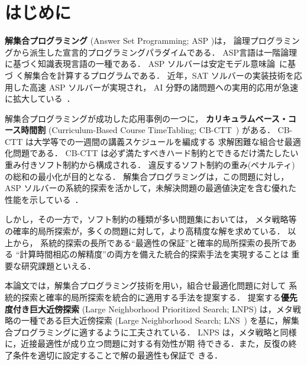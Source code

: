 \section{はじめに}

\textbf{解集合プログラミング}
(Answer Set Programming; ASP
\cite{%
  baral03:cambridge,%
  DBLP:conf/iclp/GelfondL88,%
  DBLP:journals/amai/Niemela99})は，
論理プログラミングから派生した宣言的プログラミングパラダイムである．
ASP言語は一階論理に基づく知識表現言語の一種である．
ASP ソルバーは安定モデル意味論~\cite{DBLP:conf/iclp/GelfondL88}に基づ
く解集合を計算するプログラムである．
近年，SAT ソルバーの実装技術を応用した高速 ASP ソルバーが実現され，
AI 分野の諸問題への実用的応用が急速に拡大している~\cite{ergele16a}．

解集合プログラミングが成功した応用事例の一つに，
\textbf{カリキュラムベース・コース時間割}
(Curriculum-Based Course TimeTabling; CB-CTT~\cite{DBLP:journals/anor/BonuttiCGS12})
がある．
CB-CTT は大学等での一週間の講義スケジュールを編成する
求解困難な組合せ最適化問題である．
CB-CTT は必ず満たすべきハード制約とできるだけ満たしたい
重み付きソフト制約から構成される．
違反するソフト制約の重み(ペナルティ)の総和の最小化が目的となる．
解集合プログラミングは，この問題に対し，
ASP ソルバーの系統的探索を活かして，未解決問題の最適値決定を含む優れた
性能を示している~\cite{anor/Banbara2019}．

しかし，その一方で，ソフト制約の種類が多い問題集においては，
メタ戦略等の確率的局所探索が，多くの問題に対して，より高精度な解を求めている．
以上から，
系統的探索の長所である``最適性の保証''と確率的局所探索の長所である
``計算時間相応の解精度''の両方を備えた統合的探索手法を実現することは
重要な研究課題といえる．

本論文では，解集合プログラミング技術を用い，組合せ最適化問題に対して
系統的探索と確率的局所探索を統合的に適用する手法を提案する．
%
提案する\textbf{優先度付き巨大近傍探索}
(Large Neighborhood Prioritized Search; LNPS)
は，メタ戦略の一種である巨大近傍探索
(Large Neighborhood Search; LNS~\cite{Pisinger10})
を基に，解集合プログラミングに適するように工夫されている．
LNPS は，メタ戦略と同様に，近接最適性が成り立つ問題に対する有効性が期
待できる．また，反復の終了条件を適切に設定することで解の最適性も保証で
きる．


